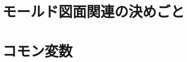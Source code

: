 \begin{appendices}
\Apart




\chapter{モールド図面関連の決めごと}





\chapter{コモン変数}





%




%

\end{appendices}




